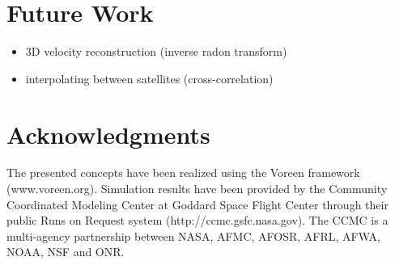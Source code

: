\documentclass[journal]{vgtc}                %
\begin{document}
\section{Future Work}
\begin{itemize}
\item 3D velocity reconstruction (inverse radon transform)
\item interpolating between satellites (cross-correlation)
\end{itemize}

\section*{Acknowledgments}
The presented concepts have been realized using the Voreen framework (www.voreen.org). Simulation results have been provided by the Community Coordinated Modeling Center at Goddard Space Flight Center through their public Runs on Request system (http://ccmc.gsfc.nasa.gov). The CCMC is a multi-agency partnership between NASA, AFMC, AFOSR, AFRL, AFWA, NOAA, NSF and ONR.




\end{document}
